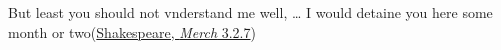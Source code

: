 \ea \label{ex:299}
But least you should not vnderstand me well, {\dots} I would detaine you here some month or two\hfill(\href{https://internetshakespeare.uvic.ca/doc/MV_F1/scene/3.2/index.html#tln-1345}{Shakespeare, \textit{Merch} 3.2.7}) %
\z
{}
